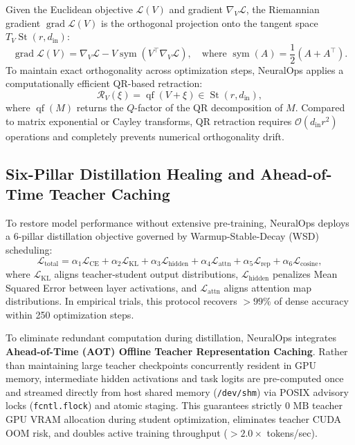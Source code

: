 \documentclass{article}
\begin{document}
Given the Euclidean objective $\mathcal{L}(V)$ and gradient $\nabla_V \mathcal{L}$, the Riemannian gradient $\operatorname{grad} \mathcal{L}(V)$ is the orthogonal projection onto the tangent space $T_V \operatorname{St}(r, d_{\text{in}})$:
\begin{equation}
    \operatorname{grad} \mathcal{L}(V) = \nabla_V \mathcal{L} - V \operatorname{sym}(V^\top \nabla_V \mathcal{L}), \quad \text{where } \operatorname{sym}(A) = \frac{1}{2}(A + A^\top).
\end{equation}
To maintain exact orthogonality across optimization steps, NeuralOps applies a computationally efficient QR-based retraction:
\begin{equation}
    \mathcal{R}_V(\xi) = \operatorname{qf}(V + \xi) \in \operatorname{St}(r, d_{\text{in}}),
\end{equation}
where $\operatorname{qf}(M)$ returns the $Q$-factor of the QR decomposition of $M$. Compared to matrix exponential or Cayley transforms, QR retraction requires $\mathcal{O}(d_{\text{in}} r^2)$ operations and completely prevents numerical orthogonality drift.

\subsection{Six-Pillar Distillation Healing and Ahead-of-Time Teacher Caching}
To restore model performance without extensive pre-training, NeuralOps deploys a 6-pillar distillation objective governed by Warmup-Stable-Decay (WSD) scheduling:
\begin{equation}
    \mathcal{L}_{\text{total}} = \alpha_1 \mathcal{L}_{\text{CE}} + \alpha_2 \mathcal{L}_{\text{KL}} + \alpha_3 \mathcal{L}_{\text{hidden}} + \alpha_4 \mathcal{L}_{\text{attn}} + \alpha_5 \mathcal{L}_{\text{rep}} + \alpha_6 \mathcal{L}_{\text{cosine}},
\end{equation}
where $\mathcal{L}_{\text{KL}}$ aligns teacher-student output distributions, $\mathcal{L}_{\text{hidden}}$ penalizes Mean Squared Error between layer activations, and $\mathcal{L}_{\text{attn}}$ aligns attention map distributions. In empirical trials, this protocol recovers $>99\%$ of dense accuracy within 250 optimization steps.

To eliminate redundant computation during distillation, NeuralOps integrates \textbf{Ahead-of-Time (AOT) Offline Teacher Representation Caching}. Rather than maintaining large teacher checkpoints concurrently resident in GPU memory, intermediate hidden activations and task logits are pre-computed once and streamed directly from host shared memory (\texttt{/dev/shm}) via POSIX advisory locks (\texttt{fcntl.flock}) and atomic staging. This guarantees strictly $0\text{ MB}$ teacher GPU VRAM allocation during student optimization, eliminates teacher CUDA OOM risk, and doubles active training throughput ($>2.0\times$ tokens/sec).
\end{document}
